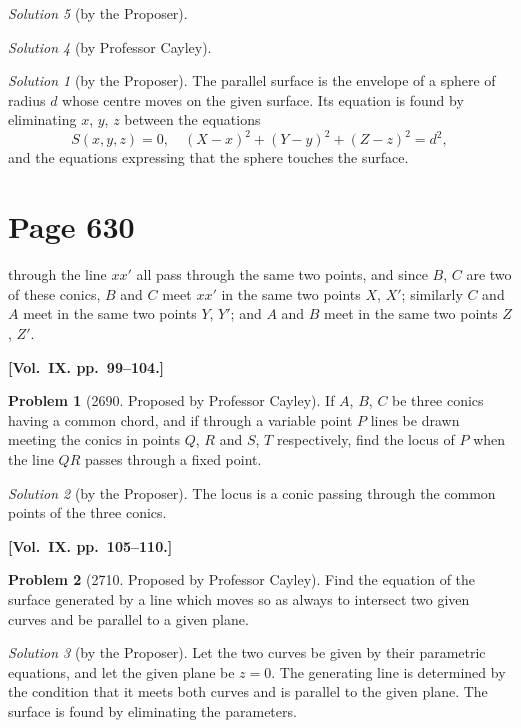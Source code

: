 \documentclass[12pt,a4paper]{article}
\theoremstyle{plain}
\theoremstyle{definition}
\newtheorem{problem}{Problem}
\theoremstyle{remark}
\newtheorem*{solution}{Solution}
\begin{document}
\begin{solution}[by the Proposer]
\begin{solution}[by Professor Cayley]
\begin{solution}[by the Proposer]
The parallel surface is the envelope of a sphere of radius $d$ whose centre moves on the given surface. Its equation is found by eliminating $x$, $y$, $z$ between the equations
\[
S(x, y, z) = 0, \quad
(X - x)^2 + (Y - y)^2 + (Z - z)^2 = d^2,
\]
and the equations expressing that the sphere touches the surface.
\end{solution}

\section*{Page 630}
\setcounter{page}{630}

through the line $xx'$ all pass through the same two points, and since $B$, $C$ are two of these conics, $B$ and $C$ meet $xx'$ in the same two points $X$, $X'$; similarly $C$ and $A$ meet in the same two points $Y$, $Y'$; and $A$ and $B$ meet in the same two points $Z$, $Z'$.

\medskip\noindent\textbf{[Vol.~IX. pp.~99--104.]}

\begin{problem}[2690. Proposed by Professor Cayley]
If $A$, $B$, $C$ be three conics having a common chord, and if through a variable point $P$ lines be drawn meeting the conics in points $Q$, $R$ and $S$, $T$ respectively, find the locus of $P$ when the line $QR$ passes through a fixed point.
\end{problem}

\begin{solution}[by the Proposer]
The locus is a conic passing through the common points of the three conics.
\end{solution}

\medskip\noindent\textbf{[Vol.~IX. pp.~105--110.]}

\begin{problem}[2710. Proposed by Professor Cayley]
Find the equation of the surface generated by a line which moves so as always to intersect two given curves and be parallel to a given plane.
\end{problem}

\begin{solution}[by the Proposer]
Let the two curves be given by their parametric equations, and let the given plane be $z = 0$. The generating line is determined by the condition that it meets both curves and is parallel to the given plane. The surface is found by eliminating the parameters.
\end{solution}


\end{solution}
\end{solution}
\end{document}
